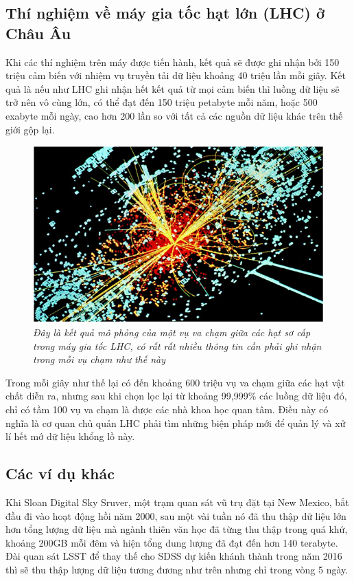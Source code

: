 \documentclass[12pt]{report}
\begin{document}
\subsection{Thí nghiệm về máy gia tốc hạt lớn (LHC) ở Châu Âu}
Khi các thí nghiệm trên máy được tiến hành, kết quả sẽ được ghi nhận bởi 150 triệu cảm biến với nhiệm vụ truyền tải dữ liệu khoảng 40 triệu lần mỗi giây. Kết quả là nếu như LHC ghi nhận hết kết quả từ mọi cảm biến thì luồng dữ liệu sẽ trở nên vô cùng lớn, có thể đạt đến 150 triệu petabyte mỗi năm, hoặc 500 exabyte mỗi ngày, cao hơn 200 lần so với tất cả các nguồn dữ liệu khác trên thế giới gộp lại.

\begin{figure}[H]
\centering
\includegraphics[scale=1]{lhc.png}
\caption{\it Đây là kết quả mô phỏng của một vụ va chạm giữa các hạt sơ cấp trong máy gia tốc LHC, có rất rất nhiều thông tin cần phải ghi nhận trong mỗi vụ chạm như thế này}
\end{figure}

Trong mỗi giây như thế lại có đến khoảng 600 triệu vụ va chạm giữa các hạt vật chất diễn ra, nhưng sau khi chọn lọc lại từ khoảng 99,999\% các luồng dữ liệu đó, chỉ có tầm 100 vụ va chạm là được các nhà khoa học quan tâm. Điều này có nghĩa là cơ quan chủ quản LHC phải tìm những biện pháp mới để quản lý và xử lí hết mớ dữ liệu khổng lồ này.

\subsection{Các ví dụ khác}
Khi Sloan Digital Sky Sruver, một trạm quan sát vũ trụ đặt tại New Mexico, bắt đầu đi vào hoạt động hồi năm 2000, sau một vài tuần nó đã thu thập dữ liệu lớn hơn tổng lượng dữ liệu mà ngành thiên văn học đã từng thu thập trong quá khứ, khoảng 200GB mỗi đêm và hiện tổng dung lượng đã đạt đến hơn 140 terabyte. Đài quan sát LSST để thay thế cho SDSS dự kiến khánh thành trong năm 2016 thì sẽ thu thập lượng dữ liệu tương đương như trên nhưng chỉ trong vòng 5 ngày.
\end{document}

